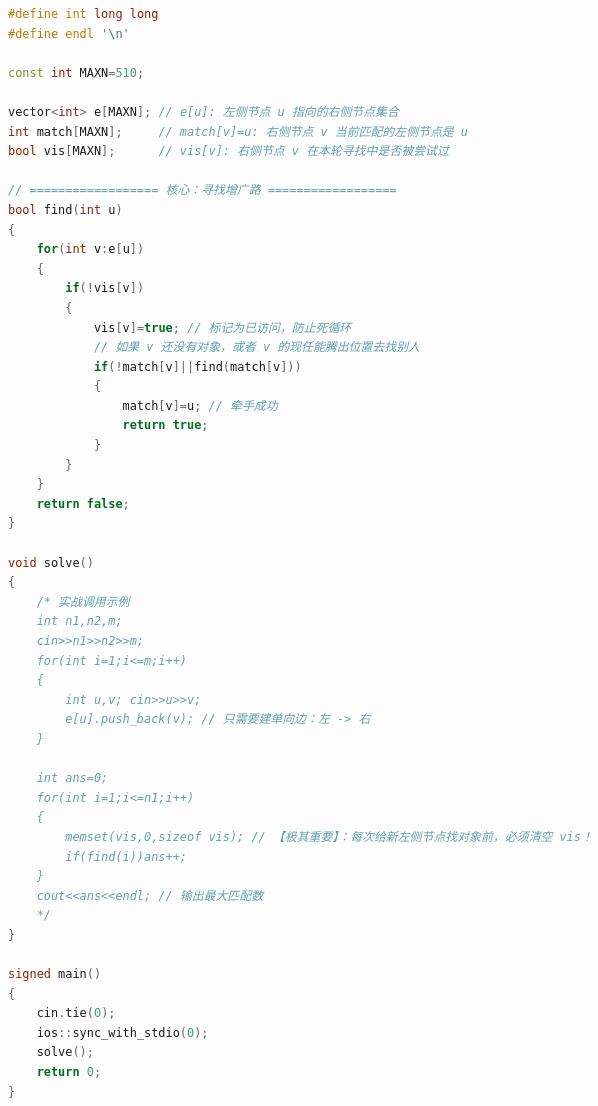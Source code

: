 \documentclass[10pt,landscape,a4paper]{article}
\begin{document}
\begin{multicols*}{3}
\begin{lstlisting}[language=C++]
#define int long long
#define endl '\n'

const int MAXN=510; 

vector<int> e[MAXN]; // e[u]: 左侧节点 u 指向的右侧节点集合
int match[MAXN];     // match[v]=u: 右侧节点 v 当前匹配的左侧节点是 u
bool vis[MAXN];      // vis[v]: 右侧节点 v 在本轮寻找中是否被尝试过

// ================== 核心：寻找增广路 ==================
bool find(int u)
{
    for(int v:e[u])
    {
        if(!vis[v])
        {
            vis[v]=true; // 标记为已访问，防止死循环
            // 如果 v 还没有对象，或者 v 的现任能腾出位置去找别人
            if(!match[v]||find(match[v]))
            {
                match[v]=u; // 牵手成功
                return true;
            }
        }
    }
    return false;
}

void solve()
{
    /* 实战调用示例
    int n1,n2,m; 
    cin>>n1>>n2>>m;
    for(int i=1;i<=m;i++)
    {
        int u,v; cin>>u>>v;
        e[u].push_back(v); // 只需要建单向边：左 -> 右
    }
    
    int ans=0;
    for(int i=1;i<=n1;i++)
    {
        memset(vis,0,sizeof vis); // 【极其重要】：每次给新左侧节点找对象前，必须清空 vis！
        if(find(i))ans++;
    }
    cout<<ans<<endl; // 输出最大匹配数
    */
}

signed main()
{
    cin.tie(0);
    ios::sync_with_stdio(0);
    solve();
    return 0;
}
\end{lstlisting}

\end{multicols*}
\end{document}
